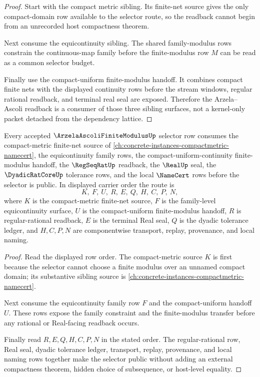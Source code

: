 \begin{proof}
Start with the compact metric sibling. Its finite-net source gives the only compact-domain row available to the selector route, so the readback cannot begin from an unrecorded host compactness theorem.

Next consume the equicontinuity sibling. The shared family-modulus rows constrain the continuous-map family before the finite-modulus row $M$ can be read as a common selector budget.

Finally use the compact-uniform finite-modulus handoff. It combines compact finite nets with the displayed continuity rows before the stream windows, regular rational readback, and terminal real seal are exposed. Therefore the Arzela--Ascoli readback is a consumer of those three sibling surfaces, not a kernel-only packet detached from the dependency lattice.
\end{proof}

\begin{theorem}
\label{thm:arzela-ascoli-finite-modulus-compactmetric-sibling-route}
Every accepted $\ArzelaAscoliFiniteModulusUp$ selector row consumes the compact-metric finite-net source of \autoref{ch:concrete-instances-compactmetric-namecert}, the equicontinuity family rows, the compact-uniform-continuity finite-modulus handoff, the $\RegSeqRatUp$ readback, the $\RealUp$ seal, the $\DyadicRatCoreUp$ tolerance rows, and the local $\NameCert$ rows before the selector is public. In displayed carrier order the route is
$$
K,\ F,\ U,\ R,\ E,\ Q,\ H,\ C,\ P,\ N,
$$
where $K$ is the compact-metric finite-net source, $F$ is the family-level equicontinuity surface, $U$ is the compact-uniform finite-modulus handoff, $R$ is regular-rational readback, $E$ is the terminal Real seal, $Q$ is the dyadic tolerance ledger, and $H,C,P,N$ are componentwise transport, replay, provenance, and local naming.
\end{theorem}

\begin{proof}
Read the displayed row order. The compact-metric source $K$ is first because the selector cannot choose a finite modulus over an unnamed compact domain; its substantive sibling source is \autoref{ch:concrete-instances-compactmetric-namecert}.

Next consume the equicontinuity family row $F$ and the compact-uniform handoff $U$. These rows expose the family constraint and the finite-modulus transfer before any rational or Real-facing readback occurs.

Finally read $R,E,Q,H,C,P,N$ in the stated order. The regular-rational row, Real seal, dyadic tolerance ledger, transport, replay, provenance, and local naming rows together make the selector public without adding an external compactness theorem, hidden choice of subsequence, or host-level equality.
\end{proof}
